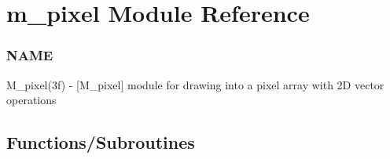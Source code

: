\hypertarget{namespacem__pixel}{}\section{m\+\_\+pixel Module Reference}
\label{namespacem__pixel}


\subsubsection*{N\+A\+ME}

M\+\_\+pixel(3f) -\/ \mbox{[}M\+\_\+pixel\mbox{]} module for drawing into a pixel array with 2D vector operations  


\subsection*{Functions/\+Subroutines}
